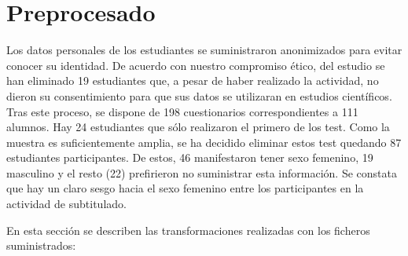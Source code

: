 \documentclass[
  12pt,
  a4paper,
  extrafontsizes,
  onecolumn,
  openright,
  table]{memoir}
\begin{document}
\hypertarget{sec-preprocesado}{%
\section{Preprocesado}\label{sec-preprocesado}}

Los datos personales de los estudiantes se suministraron anonimizados
para evitar conocer su identidad. De acuerdo con nuestro compromiso
ético, del estudio se han eliminado 19 estudiantes que, a pesar de haber
realizado la actividad, no dieron su consentimiento para que sus datos
se utilizaran en estudios científicos. Tras este proceso, se dispone de
198 cuestionarios correspondientes a 111 alumnos. Hay 24 estudiantes que
sólo realizaron el primero de los test. Como la muestra es
suficientemente amplia, se ha decidido eliminar estos test quedando 87
estudiantes participantes. De estos, 46 manifestaron tener sexo
femenino, 19 masculino y el resto (22) prefirieron no suministrar esta
información. Se constata que hay un claro sesgo hacia el sexo femenino
entre los participantes en la actividad de subtitulado.

En esta sección se describen las transformaciones realizadas con los
ficheros suministrados:
\end{document}
